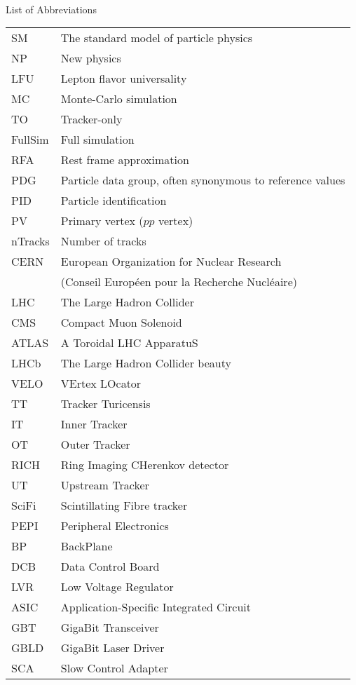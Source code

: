 \singlespacing \normalsize
\hbox{\ }

\vspace{.5in}

\begin{center}
\large{List of Abbreviations}
\end{center}

\vspace{3pt}

\begin{supertabular}{ll}
    SM      & The standard model of particle physics \\
    NP      & New physics \\
    LFU     & Lepton flavor universality \\
    MC      & Monte-Carlo simulation \\
    TO      & Tracker-only \\
    FullSim & Full simulation \\
    RFA     & Rest frame approximation \\
    PDG     & Particle data group, often synonymous to reference values \\
    PID     & Particle identification \\
    PV      & Primary vertex ($pp$ vertex) \\
    nTracks & Number of tracks \\
    CERN    & European Organization for Nuclear Research \\
            & (Conseil Européen pour la Recherche Nucléaire) \\
    LHC     & The Large Hadron Collider \\
    CMS     & Compact Muon Solenoid \\
    ATLAS   & A Toroidal LHC ApparatuS \\
    LHCb    & The Large Hadron Collider beauty \\
    VELO    & VErtex LOcator \\
    TT      & Tracker Turicensis \\
    IT      & Inner Tracker \\
    OT      & Outer Tracker \\
    RICH    & Ring Imaging CHerenkov detector \\
    UT      & Upstream Tracker \\
    SciFi   & Scintillating Fibre tracker \\
    PEPI    & Peripheral Electronics \\
    BP      & BackPlane \\
    DCB     & Data Control Board \\
    LVR     & Low Voltage Regulator \\
    ASIC    & Application-Specific Integrated Circuit \\
    GBT     & GigaBit Transceiver \\
    GBLD    & GigaBit Laser Driver \\
    SCA     & Slow Control Adapter \\
\end{supertabular}
